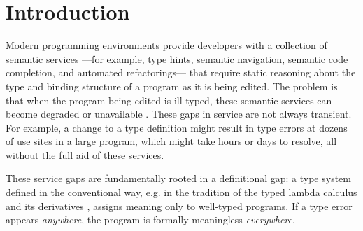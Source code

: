 \section{Introduction}
\label{sec:introduction}


Modern programming environments provide developers with a collection of semantic services%
---for example, type hints, semantic navigation, semantic code completion, and automated refactorings---%
that require static reasoning about the type and binding structure of a program as it is being edited. 
The problem is that when the program being edited is ill-typed, 
these semantic services can become degraded or unavailable \cite{HazelnutSNAPL}. 
These gaps in service are not always transient. 
For example, a change to a type definition might result in type errors at dozens of use sites in a large program, which might take hours or days to resolve, all without the full aid of these services.

These service gaps are fundamentally rooted in a definitional gap: a type system defined in the conventional way, 
e.g. in the tradition of the typed lambda calculus and its derivatives \cite{TaplBook},
assigns meaning only to well-typed programs. 
If a type error appears \emph{anywhere}, the program is formally meaningless \emph{everywhere}.

